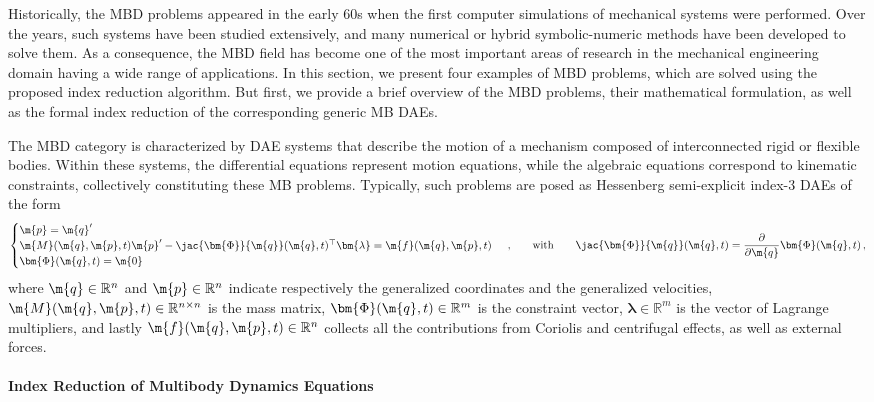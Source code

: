 Historically, the \ac{MBD} problems appeared in the early 60s when the first computer simulations of mechanical systems were performed. Over the years, such systems have been studied extensively, and many numerical or hybrid symbolic-numeric methods have been developed to solve them. As a consequence, the \ac{MBD} field has become one of the most important areas of research in the mechanical engineering domain having a wide range of applications. In this section, we present four examples of \ac{MBD} problems, which are solved using the proposed index reduction algorithm. But first, we provide a brief overview of the \ac{MBD} problems, their mathematical formulation, as well as the formal index reduction of the corresponding generic \ac{MB} \acp{DAE}.

The \ac{MBD} category is characterized by \ac{DAE} systems that describe the motion of a mechanism composed of interconnected rigid or flexible bodies. Within these systems, the differential equations represent motion equations, while the algebraic equations correspond to kinematic constraints, collectively constituting these \ac{MB} problems. Typically, such problems are posed as Hessenberg semi-explicit index-3 \acp{DAE} of the form
%
\begin{equation}
  \begin{cases}
    \m{p} = \m{q}^{\prime} \\
    \m{M}(\m{q}, \m{p}, t)\m{p}^{\prime} - \jac{\bm{\Phi}}{\m{q}}(\m{q}, t)^{\top}\bm{\lambda} = \m{f}(\m{q}, \m{p} ,t) \\
    \bm{\Phi}(\m{q}, t) = \m{0}
  \end{cases} \, \text{,}
  \qquad \text{with} \qquad \jac{\bm{\Phi}}{\m{q}}(\m{q}, t) = \dfrac{\partial}{\partial\m{q}}\bm{\Phi}(\m{q}, t)
  \, \text{,}
  \label{chap4:eq:mbd_fo}
\end{equation}
%
where $\m{q} \in \mathbb{R}^{n}$ and $\m{p} \in \mathbb{R}^{n}$ indicate respectively the generalized coordinates and the generalized velocities, $\m{M}(\m{q}, \m{p}, t) \in \mathbb{R}^{n\times n}$ is the mass matrix, $\bm{\Phi}(\m{q}, t) \in \mathbb{R}^{m}$ is the constraint vector, $\bm{\lambda} \in \mathbb{R}^{m}$ is the vector of Lagrange multipliers, and lastly $\m{f}(\m{q}, \m{p}, t) \in \mathbb{R}^{n}$ collects all the contributions from Coriolis and centrifugal effects, as well as external forces.

\paragraph{Index Reduction of Multibody Dynamics Equations}

